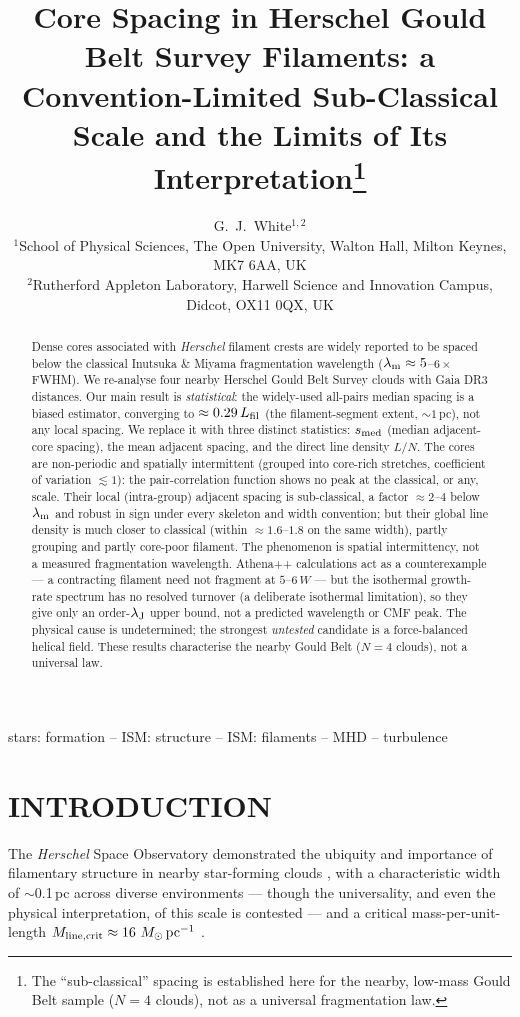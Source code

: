 \documentclass[usenatbib,twoside,twocolumn]{mnras}
\title[Sub-classical core spacing in HGBS filaments]{Core Spacing in Herschel Gould Belt Survey Filaments: a Convention-Limited Sub-Classical Scale and the Limits of Its Interpretation\thanks{The ``sub-classical'' spacing is established here for the nearby, low-mass Gould Belt sample ($N=4$ clouds), not as a universal fragmentation law.}}
\author[G.~J.~White]{G.~J.~White$^{1,2}$\\
$^{1}$School of Physical Sciences, The Open University, Walton Hall, Milton Keynes, MK7 6AA, UK\\
$^{2}$Rutherford Appleton Laboratory, Harwell Science and Innovation Campus, Didcot, OX11 0QX, UK}
\begin{document}
\maketitle

\begin{abstract}
Dense cores associated with \textit{Herschel} filament crests are widely reported to be spaced below the classical Inutsuka \& Miyama fragmentation wavelength ($\lambda_{\rm m}\approx5$--$6\times$FWHM). We re-analyse four nearby Herschel Gould Belt Survey clouds with Gaia DR3 distances. Our main result is \emph{statistical}: the widely-used all-pairs median spacing is a biased estimator, converging to $\approx0.29\,L_{\rm fil}$ (the filament-segment extent, $\sim1$\,pc), not any local spacing. We replace it with three distinct statistics: $s_{\rm med}$ (median adjacent-core spacing), the mean adjacent spacing, and the direct line density $L/N$. The cores are non-periodic and spatially intermittent (grouped into core-rich stretches, coefficient of variation $\lesssim1$): the pair-correlation function shows no peak at the classical, or any, scale. Their local (intra-group) adjacent spacing is sub-classical, a factor $\approx2$--$4$ below $\lambda_{\rm m}$ and robust in sign under every skeleton and width convention; but their global line density is much closer to classical (within $\approx1.6$--$1.8$ on the same width), partly grouping and partly core-poor filament. The phenomenon is spatial intermittency, not a measured fragmentation wavelength. Athena++ calculations act as a counterexample --- a contracting filament need not fragment at $5$--$6\,W$ --- but the isothermal growth-rate spectrum has no resolved turnover (a deliberate isothermal limitation), so they give only an order-$\lambda_{\rm J}$ upper bound, not a predicted wavelength or CMF peak. The physical cause is undetermined; the strongest \emph{untested} candidate is a force-balanced helical field. These results characterise the nearby Gould Belt ($N=4$ clouds), not a universal law.
\end{abstract}


\begin{keywords}
stars: formation -- ISM: structure -- ISM: filaments -- MHD -- turbulence
\end{keywords}

\section{INTRODUCTION}

The \textit{Herschel} Space Observatory demonstrated the ubiquity and importance of filamentary structure in nearby star-forming clouds \citep{Andre2010}, with a characteristic width of $\sim$0.1\,pc across diverse environments \citep{Arzoumanian2011} --- though the universality, and even the physical interpretation, of this scale is contested \citep{Panopoulou2017,Panopoulou2022} --- and a critical mass-per-unit-length $M_{\rm line,crit}\approx16~M_\odot\,{\rm pc^{-1}}$ \citep{Ostriker1964}.
\end{document}
